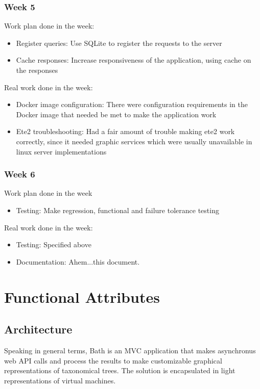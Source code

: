 \documentclass[10pt]{article}
\begin{document}
  \subsubsection{Week 5}
  	Work plan done in the week:
  	\begin{itemize}
  		\item Register queries: Use SQLite to register the requests to the server
  		\item Cache responses: Increase responsiveness of the application, using cache on the responses
	\end{itemize}
	Real work done in the week:
	\begin{itemize}
		\item Docker image configuration: There were configuration requirements in the Docker image that needed be met to make the application work
		\item Ete2 troubleshooting: Had a fair amount of trouble making ete2 work correctly, since it needed graphic services which were usually unavailable in linux server implementations
	\end{itemize}
  \subsubsection{Week 6}
  	Work plan done in the week
  	\begin{itemize}
  		\item Testing: Make regression, functional and failure tolerance testing
	\end{itemize}
	Real work done in the week:
	\begin{itemize}
		\item Testing: Specified above
		\item Documentation: Ahem...this document.
	\end{itemize}

\section{Functional Attributes}
 \subsection{Architecture}
 Speaking in general terms, Bath is an MVC application that makes asynchronus web API calls and process the results to make customizable graphical representations of taxonomical trees. The solution is encapsulated in light representations of virtual machines. \\
 
\end{document}

